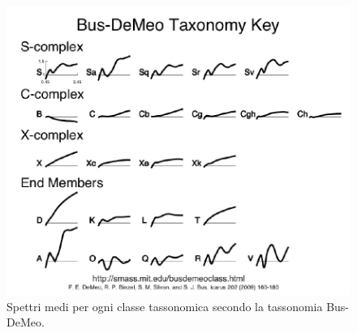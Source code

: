 \begin{figure}[!ht]
    \centering
    \includegraphics[scale=0.44]{figure/spettro_bus.jpg}
    \caption[Spettri medi per ogni classe tassonomica secondo la tassonomia Bus-DeMeo.]{Spettri medi per ogni classe tassonomica secondo la tassonomia Bus-DeMeo. \citep{demeo_extension_2009}}
    \label{spettro_bus}
\end{figure}

